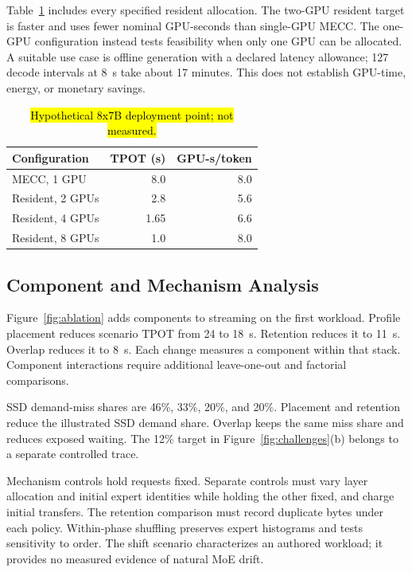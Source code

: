 \documentclass[conference,9pt,letterpaper]{IEEEtran}
\newcommand{\draftnote}[1]{{\sethlcolor{DraftYellow}\hl{#1}}}
\newcommand{\draftvalue}[1]{{\setlength{\fboxsep}{0.4pt}\colorbox{DraftYellow}{#1}}}
\newcommand{\mecc}{\textsc{MECC}}
\begin{document}
Table~\ref{tab:gpu} includes every specified resident allocation. The two-GPU resident target is faster and uses fewer nominal GPU-seconds than single-GPU \mecc{}. The one-GPU configuration instead tests feasibility when only one GPU can be allocated. A suitable use case is offline generation with a declared latency allowance; \draftvalue{127} decode intervals at \draftvalue{8}~s take about \draftvalue{17} minutes. This does not establish GPU-time, energy, or monetary savings.

\begin{table}[t]
\caption{\draftnote{Hypothetical 8x7B deployment point; not measured.}}
\label{tab:gpu}\centering
\begin{tabular}{lrr}\toprule
Configuration & TPOT (s) & GPU-s/token\\\midrule
\mecc{}, \draftvalue{1} GPU & \draftvalue{8.0} & \draftvalue{8.0}\\
Resident, \draftvalue{2} GPUs & \draftvalue{2.8} & \draftvalue{5.6}\\
Resident, \draftvalue{4} GPUs & \draftvalue{1.65} & \draftvalue{6.6}\\
Resident, \draftvalue{8} GPUs & \draftvalue{1.0} & \draftvalue{8.0}\\\bottomrule
\end{tabular}
\end{table}

\subsection{Component and Mechanism Analysis}
Figure~\ref{fig:ablation} adds components to streaming on the first workload. Profile placement reduces scenario TPOT from \draftvalue{24} to \draftvalue{18}~s. Retention reduces it to \draftvalue{11}~s. Overlap reduces it to \draftvalue{8}~s. Each change measures a component within that stack. Component interactions require additional leave-one-out and factorial comparisons.

SSD demand-miss shares are \draftvalue{46}\%, \draftvalue{33}\%, \draftvalue{20}\%, and \draftvalue{20}\%. Placement and retention reduce the illustrated SSD demand share. Overlap keeps the same miss share and reduces exposed waiting. The \draftvalue{12}\% target in Figure~\ref{fig:challenges}(b) belongs to a separate controlled trace.

Mechanism controls hold requests fixed. Separate controls must vary layer allocation and initial expert identities while holding the other fixed, and charge initial transfers. The retention comparison must record duplicate bytes under each policy. Within-phase shuffling preserves expert histograms and tests sensitivity to order. The shift scenario characterizes an authored workload; it provides no measured evidence of natural MoE drift.
\end{document}
